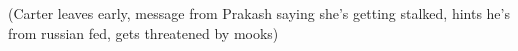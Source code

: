 (Carter leaves early, message from Prakash saying she's getting stalked, hints he's from russian fed, gets threatened by mooks)
